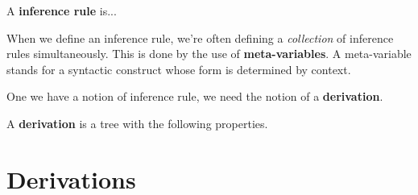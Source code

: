 \begin{definition}
  A \textbf{inference rule} is...
\end{definition}

\begin{example}

\end{example}

When we define an inference rule, we're often defining a \textit{collection} of inference rules simultaneously.
This is done by the use of \textbf{meta-variables}.
A meta-variable stands for a syntactic construct whose form is determined by context.

One we have a notion of inference rule, we need the notion of a \textbf{derivation}.

\begin{definition}
A \textbf{derivation} is a tree with the following properties.
\end{definition}

\section{Derivations}
